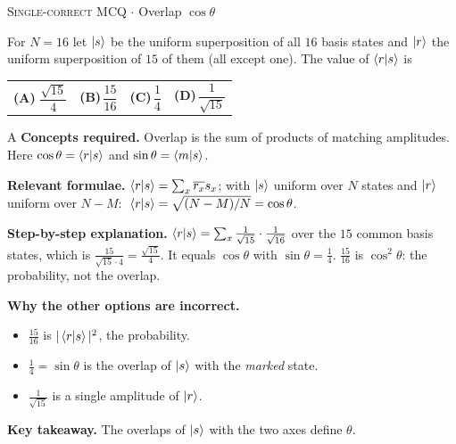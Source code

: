 \documentclass[11pt,a4paper]{article}
\newcommand{\optlabel}[1]{\textbf{(#1)}}
\newcommand{\correctlabel}[1]{\textcolor{okgreen}{\textbf{(#1)}\,\ding{51}}}
\newenvironment{qitem}[1]{\begin{list}{}{\setlength{\leftmargin}{3.3em}\setlength{\labelwidth}{3.1em}%
  \setlength{\labelsep}{0.2em}\setlength{\topsep}{3pt}\setlength{\parsep}{3pt}}\item[\textbf{Q.#1}\hfill]}{\end{list}}
\newcommand{\qsep}{\par\vspace{2pt}{\color{black!15}\hrule}\vspace{4pt}}
\newcommand{\qmeta}[2]{{\footnotesize\color{black!60}\textsc{#1} \;$\cdot$\; #2}\par}
\begin{document}
\begin{qitem}{31}
\qmeta{Single-correct MCQ}{Overlap $\cos\theta$}
For $N = 16$ let $\ket{s}$ be the uniform superposition of all $16$ basis states and $\ket{r}$ the uniform superposition of $15$ of them (all except one). The value of $\braket{r|s}$ is
\par\smallskip\noindent\begin{tabularx}{\linewidth}{@{}*{4}{L}@{}}
\correctlabel{A}\,$\dfrac{\sqrt{15}}{4}$ & \optlabel{B}\,$\dfrac{15}{16}$ & \optlabel{C}\,$\dfrac14$ & \optlabel{D}\,$\dfrac{1}{\sqrt{15}}$
\end{tabularx}
\end{qitem}
\begin{solbox}{A}
\textbf{\color{brand}Concepts required.} Overlap is the sum of products of matching amplitudes. Here $\cos\theta = \braket{r|s}$ and $\sin\theta = \braket{m|s}$.

\textbf{\color{brand}Relevant formulae.} $\braket{r|s} = \sum_x\overline{r_x}s_x$; with $\ket{s}$ uniform over $N$ states and $\ket{r}$ uniform over $N - M$: $\;\braket{r|s} = \sqrt{(N-M)/N} = \cos\theta$.

\textbf{\color{brand}Step-by-step explanation.} $\braket{r|s} = \sum_{x}\frac{1}{\sqrt{15}}\cdot\frac{1}{\sqrt{16}}$ over the $15$ common basis states, which is $\frac{15}{\sqrt{15}\cdot 4} = \frac{\sqrt{15}}{4}$.
It equals $\cos\theta$ with $\sin\theta = \frac14$. $\frac{15}{16}$ is $\cos^2\theta$: the probability, not the overlap.

\textbf{\color{brand}Why the other options are incorrect.}
\begin{itemize}[leftmargin=2.4em, itemsep=1pt, topsep=2pt]
\item[\textbf{(B)}] $\frac{15}{16}$ is $|\braket{r|s}|^2$, the probability.
\item[\textbf{(C)}] $\frac14 = \sin\theta$ is the overlap of $\ket{s}$ with the \emph{marked} state.
\item[\textbf{(D)}] $\frac{1}{\sqrt{15}}$ is a single amplitude of $\ket{r}$.
\end{itemize}
\textbf{\color{brand}Key takeaway.} The overlaps of $\ket{s}$ with the two axes define $\theta$.
\end{solbox}
\qsep
\end{document}

